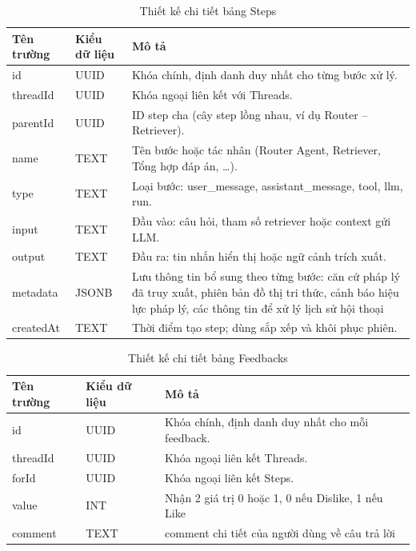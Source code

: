 \documentclass[../DoAn.tex]{subfiles}
\begin{document}
\begin{table}[H]
\centering
\begin{tabular}{|l|l|p{8cm}|}
\hline
\textbf{Tên trường} & \textbf{Kiểu dữ liệu} & \textbf{Mô tả} \\ \hline
id & UUID & Khóa chính, định danh duy nhất cho từng bước xử lý. \\ \hline
threadId & UUID & Khóa ngoại liên kết với Threads. \\ \hline
parentId & UUID & ID step cha (cây step lồng nhau, ví dụ Router -- Retriever). \\ \hline
name & TEXT & Tên bước hoặc tác nhân (Router Agent, Retriever, Tổng hợp đáp án, \ldots). \\ \hline
type & TEXT & Loại bước: user\_message, assistant\_message, tool, llm, run. \\ \hline
input & TEXT & Đầu vào: câu hỏi, tham số retriever hoặc context gửi LLM. \\ \hline
output & TEXT & Đầu ra: tin nhắn hiển thị hoặc ngữ cảnh trích xuất. \\ \hline
metadata & JSONB & Lưu thông tin bổ sung theo từng bước: căn cứ pháp lý đã truy xuất, phiên bản đồ thị tri thức, cảnh báo hiệu lực pháp lý, các thông tin để xử lý lịch sử hội thoại \\ \hline
createdAt & TEXT & Thời điểm tạo step; dùng sắp xếp và khôi phục phiên. \\ \hline
\end{tabular}
\caption{Thiết kế chi tiết bảng Steps}
\label{table:db_steps}
\end{table}

\begin{table}[H]
\centering
\begin{tabular}{|l|l|p{8cm}|}
\hline
\textbf{Tên trường} & \textbf{Kiểu dữ liệu} & \textbf{Mô tả} \\ \hline
id & UUID & Khóa chính, định danh duy nhất cho mỗi feedback. \\ \hline
threadId & UUID & Khóa ngoại liên kết Threads. \\ \hline
forId & UUID & Khóa ngoại liên kết Steps. \\ \hline
value & INT & Nhận 2 giá trị 0 hoặc 1, 0 nếu Dislike, 1 nếu Like \\ \hline
comment & TEXT & comment chi tiết của người dùng về câu trả lời \\ \hline
\end{tabular}
\caption{Thiết kế chi tiết bảng Feedbacks}
\label{table:db_feedbacks}
\end{table}
\end{document}
